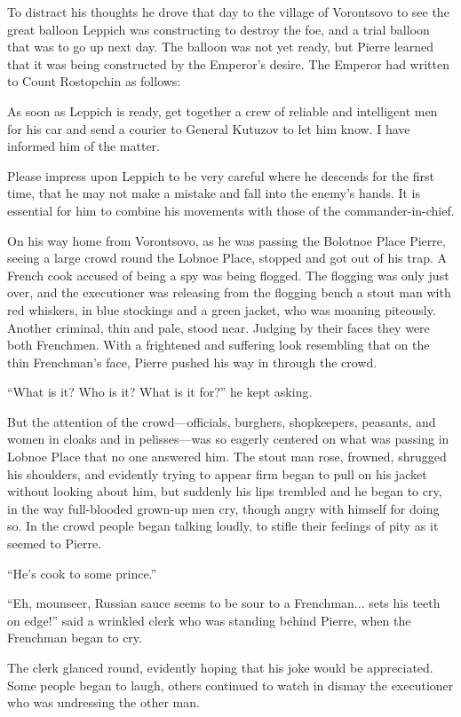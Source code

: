 To distract his thoughts he drove that day to the village of
Vorontsovo to see the great balloon Leppich was constructing to
destroy the foe, and a trial balloon that was to go up next
day. The balloon was not yet ready, but Pierre learned that it
was being constructed by the Emperor's desire. The Emperor had
written to Count Rostopchin as follows:

As soon as Leppich is ready, get together a crew of reliable and
intelligent men for his car and send a courier to General Kutuzov
to let him know. I have informed him of the matter.

Please impress upon Leppich to be very careful where he descends
for the first time, that he may not make a mistake and fall into
the enemy's hands. It is essential for him to combine his
movements with those of the commander-in-chief.

On his way home from Vorontsovo, as he was passing the Bolotnoe
Place Pierre, seeing a large crowd round the Lobnoe Place,
stopped and got out of his trap. A French cook accused of being a
spy was being flogged. The flogging was only just over, and the
executioner was releasing from the flogging bench a stout man
with red whiskers, in blue stockings and a green jacket, who was
moaning piteously. Another criminal, thin and pale, stood
near. Judging by their faces they were both Frenchmen. With a
frightened and suffering look resembling that on the thin
Frenchman's face, Pierre pushed his way in through the crowd.

``What is it? Who is it? What is it for?'' he kept asking.

But the attention of the crowd---officials, burghers,
shopkeepers, peasants, and women in cloaks and in pelisses---was
so eagerly centered on what was passing in Lobnoe Place that no
one answered him. The stout man rose, frowned, shrugged his
shoulders, and evidently trying to appear firm began to pull on
his jacket without looking about him, but suddenly his lips
trembled and he began to cry, in the way full-blooded grown-up
men cry, though angry with himself for doing so. In the crowd
people began talking loudly, to stifle their feelings of pity as
it seemed to Pierre.

``He's cook to some prince.''

``Eh, mounseer, Russian sauce seems to be sour to a
Frenchman... sets his teeth on edge!'' said a wrinkled clerk who
was standing behind Pierre, when the Frenchman began to cry.

The clerk glanced round, evidently hoping that his joke would be
appreciated. Some people began to laugh, others continued to
watch in dismay the executioner who was undressing the other man.

